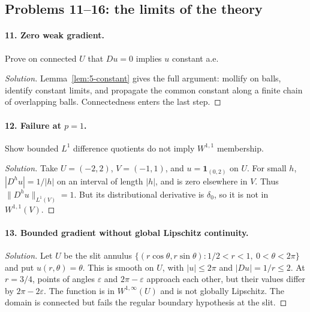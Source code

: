 \subsection{Problems 11--16: the limits of the theory}
\paragraph{11. Zero weak gradient.}
Prove on connected $U$ that $Du=0$ implies $u$ constant a.e.
\begin{proof}[Solution]
Lemma~\ref{lem:5-constant} gives the full argument: mollify on balls,
identify constant limits, and propagate the common constant along a
finite chain of overlapping balls. Connectedness enters the last step.
\end{proof}

\paragraph{12. Failure at $p=1$.}
Show bounded $L^1$ difference quotients do not imply $W^{1,1}$ membership.
\begin{proof}[Solution]
Take $U=(-2,2)$, $V=(-1,1)$, and $u=\mathbf1_{(0,2)}$ on $U$.
For small $h$, $|D^hu|=1/|h|$ on an interval of length $|h|$,
and is zero elsewhere in $V$. Thus $\|D^hu\|_{L^1(V)}=1$.
But its distributional derivative is $\delta_0$, so it is not in
$W^{1,1}(V)$.
\end{proof}

\paragraph{13. Bounded gradient without global Lipschitz continuity.}
\begin{proof}[Solution]
Let $U$ be the slit annulus
$\{(r\cos\theta,r\sin\theta):1/2<r<1,\ 0<\theta<2\pi\}$
and put $u(r,\theta)=\theta$.
This is smooth on $U$, with $|u|\leq2\pi$ and $|Du|=1/r\leq2$.
At $r=3/4$, points of angles $\varepsilon$ and $2\pi-\varepsilon$
approach each other, but their values differ by $2\pi-2\varepsilon$.
The function is in $W^{1,\infty}(U)$ and is not globally Lipschitz.
The domain is connected but fails the regular boundary hypothesis at
the slit.
\end{proof}
\Needspace{45mm}

